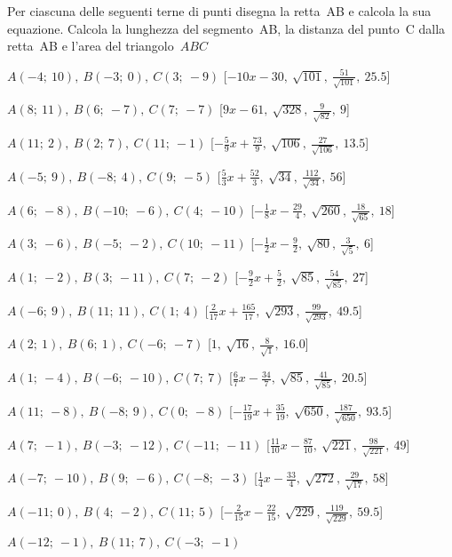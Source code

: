 \begin{esercizio}\label{ese:}
 Per ciascuna delle seguenti terne di 
punti disegna la retta~AB e calcola la sua equazione. 
Calcola la lunghezza del segmento~AB, la distanza del punto~C dalla retta~AB 
e l'area del triangolo~$ABC$
 \begin{enumeratea}
  \item  $A(-4;~10),~B(-3;~0),~C(3;~-9)$ \hfill 
   [$-10 x -30,~\sqrt{101},~\frac{51}{\sqrt{101}},~25.5$]
  \item  $A(8;~11),~B(6;~-7),~C(7;~-7)$ \hfill 
   [$9 x -61,~\sqrt{328},~\frac{9}{\sqrt{82}},~9$]
  \item  $A(11;~2),~B(2;~7),~C(11;~-1)$ \hfill 
   [$-\frac{5}{9} x +\frac{73}{9},~\sqrt{106},~\frac{27}{\sqrt{106}},~13.5$]
  \item  $A(-5;~9),~B(-8;~4),~C(9;~-5)$ \hfill 
   [$\frac{5}{3} x +\frac{52}{3},~\sqrt{34},~\frac{112}{\sqrt{34}},~56$]
  \item  $A(6;~-8),~B(-10;~-6),~C(4;~-10)$ \hfill 
   [$-\frac{1}{8} x -\frac{29}{4},~\sqrt{260},~\frac{18}{\sqrt{65}},~18$]
  \item  $A(3;~-6),~B(-5;~-2),~C(10;~-11)$ \hfill 
   [$-\frac{1}{2} x -\frac{9}{2},~\sqrt{80},~\frac{3}{\sqrt{5}},~6$]
  \item  $A(1;~-2),~B(3;~-11),~C(7;~-2)$ \hfill 
   [$-\frac{9}{2} x +\frac{5}{2},~\sqrt{85},~\frac{54}{\sqrt{85}},~27$]
  \item  $A(-6;~9),~B(11;~11),~C(1;~4)$ \hfill 
   [$\frac{2}{17} x +\frac{165}{17},~\sqrt{293},~\frac{99}{\sqrt{293}},~49.5$]
  \item  $A(2;~1),~B(6;~1),~C(-6;~-7)$ \hfill 
   [$1,~\sqrt{16},~\frac{8}{\sqrt{1}},~16.0$]
  \item  $A(1;~-4),~B(-6;~-10),~C(7;~7)$ \hfill 
   [$\frac{6}{7} x -\frac{34}{7},~\sqrt{85},~\frac{41}{\sqrt{85}},~20.5$]
  \item  $A(11;~-8),~B(-8;~9),~C(0;~-8)$ \hfill 
   [$-\frac{17}{19} x +\frac{35}{19},~\sqrt{650},~\frac{187}{\sqrt{650}},~93.5$]
  \item  $A(7;~-1),~B(-3;~-12),~C(-11;~-11)$ \hfill 
   [$\frac{11}{10} x -\frac{87}{10},~\sqrt{221},~\frac{98}{\sqrt{221}},~49$]
  \item  $A(-7;~-10),~B(9;~-6),~C(-8;~-3)$ \hfill 
   [$\frac{1}{4} x -\frac{33}{4},~\sqrt{272},~\frac{29}{\sqrt{17}},~58$]
  \item  $A(-11;~0),~B(4;~-2),~C(11;~5)$ \hfill 
   [$-\frac{2}{15} x -\frac{22}{15},~\sqrt{229},~\frac{119}{\sqrt{229}},~59.5$]
  \item  $A(-12;~-1),~B(11;~7),~C(-3;~-1)$ \hfill 

\end{enumeratea}
\end{esercizio}
